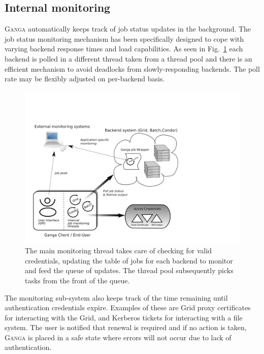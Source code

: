 \documentclass{elsart}
\def\ganga {\textsc{Ganga}\xspace}
\def\grid {Grid\xspace}
\begin{document}
\subsection{Internal monitoring}
\label{sec:GangaMonitoring}
\ganga automatically keeps track of job status updates in the background.  The
job status monitoring mechanism has been specifically designed to cope with
varying backend response times and load capabilities. As seen in
Fig.~\ref{fig:job_status_monitoring_mechanism} each backend is polled in a
different thread taken from a thread pool and there is an efficient mechanism
to avoid deadlocks from slowly-responding backends. The poll rate may be
flexibly adjusted on per-backend basis.
\begin{figure}[htbp]
  \begin{center}
    \includegraphics[width=1 \textwidth]{monitoring.pdf}
    \caption{The main monitoring thread takes care of checking for valid
      credentials, updating the table of jobs for each backend to monitor and
      feed the queue of updates. The thread pool subsequently picks tasks from
      the front of the queue.}
    \label{fig:job_status_monitoring_mechanism}
  \end{center}
\end{figure}

The monitoring sub-system also keeps track of the time remaining until
authentication credentials expire. Examples of these are \grid proxy certificates
for interacting with the \grid, and Kerberos  tickets for interacting with a
file system. The user is notified that renewal is required and if no action is
taken, \ganga is placed in a safe state where errors will not occur due to
lack of authentication.
\end{document}
